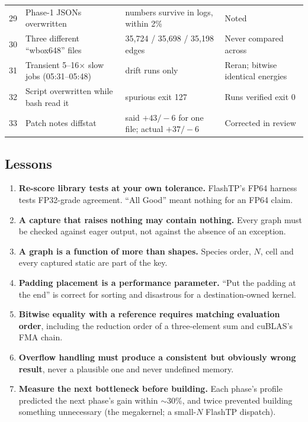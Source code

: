 \begin{longtable}{p{0.5cm}p{4.4cm}p{6.0cm}p{4.0cm}}
29 & Phase-1 JSONs overwritten & numbers survive in logs, within 2\% & Noted \\
30 & Three different ``wbox648'' files & 35{,}724 / 35{,}698 / 35{,}198 edges & Never compared across \\
31 & Transient 5--16$\times$ slow jobs (05:31--05:48) & drift runs only & Reran; bitwise identical energies \\
32 & Script overwritten while bash read it & spurious exit 127 & Runs verified exit 0 \\
33 & Patch notes diffstat & said $+43/-6$ for one file; actual $+37/-6$ & Corrected in review \\
\bottomrule
\end{longtable}

\subsection{Lessons}
\begin{enumerate}
  \item \textbf{Re-score library tests at your own tolerance.} FlashTP's FP64 harness tests FP32-grade agreement. ``All Good'' meant nothing for an FP64 claim.
  \item \textbf{A capture that raises nothing may contain nothing.} Every graph must be checked against eager output, not against the absence of an exception.
  \item \textbf{A graph is a function of more than shapes.} Species order, $N$, cell and every captured static are part of the key.
  \item \textbf{Padding placement is a performance parameter.} ``Put the padding at the end'' is correct for sorting and disastrous for a destination-owned kernel.
  \item \textbf{Bitwise equality with a reference requires matching evaluation order}, including the reduction order of a three-element sum and cuBLAS's FMA chain.
  \item \textbf{Overflow handling must produce a consistent but obviously wrong result}, never a plausible one and never undefined memory.
  \item \textbf{Measure the next bottleneck before building.} Each phase's profile predicted the next phase's gain within $\sim$30\%, and twice prevented building something unnecessary (the megakernel; a small-$N$ FlashTP dispatch).
\end{enumerate}
